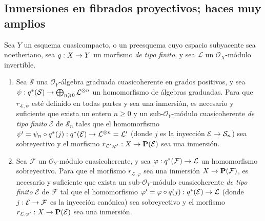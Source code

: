 \documentclass[oneside,10pt]{amsart}
\makeatletter
\renewcommand{\geq}{\geqslant}
\newcommand{\ega@arrow}[2]{\mathchoice{#1}{#2}{#2}{#2}}
\renewcommand{\to}{\ega@arrow{\longrightarrow}{\rightarrow}}
\newcommand{\oldpage}[2][]{\marginnote{\normalfont\footnotesize\textbf{#1}~|~#2}\ignorespaces}
\let\EGAOriginalLabel\label
\renewcommand{\label}[1]{\phantomsection\EGAOriginalLabel{#1}}
\makeatother
\begin{document}
\subsection{Inmersiones en fibrados proyectivos; haces muy amplios}
\label{subsection:II.4.4-fr}

\begin{proposition}[4.4.1]
\label{II.4.4.1-fr}
Sea $Y$ un esquema cuasicompacto, o un preesquema cuyo espacio subyacente sea noetheriano, sea $q:X\to Y$ un morfismo \emph{de tipo finito}, y sea $\mathcal{L}$ un $\mathcal{O}_X$-módulo invertible.
\begin{enumerate}
  \item[\rm{(i)}] Sea $\mathcal{S}$ una $\mathcal{O}_Y$-álgebra graduada cuasicoherente en grados positivos, y sea $\psi:q^*(\mathcal{S})\to\bigoplus_{n\geq0}\mathcal{L}^{\otimes n}$ un homomorfismo de álgebras graduadas.
    Para que $r_{\mathcal{L},\psi}$ esté definido en todas partes y sea una inmersión, es necesario y
\oldpage[II]{79}
    suficiente que exista un entero $n\geq0$ y un sub-$\mathcal{O}_Y$-módulo cuasicoherente \emph{de tipo finito} $\mathcal{E}$ de $\mathcal{S}_n$ tales que el homomorfismo $\psi'=\psi_n\circ q^*(j):q^*(\mathcal{E})
  \to\mathcal{L}^{\otimes n}=\mathcal{L}'$ (donde $j$ es la inyección $\mathcal{E}\to\mathcal{S}_n$) sea sobreyectivo y el morfismo $r_{\mathcal{L}',\varphi'}:X\to\mathbf{P}(\mathcal{E})$ sea una inmersión.
  \item[\rm{(ii)}] Sea $\mathcal{F}$ un $\mathcal{O}_Y$-módulo cuasicoherente, y sea $\varphi:q^*(\mathcal{F})\to\mathcal{L}$ un homomorfismo sobreyectivo.
    Para que el morfismo $r_{\mathcal{L},\varphi}$ sea una inmersión $X\to\mathbf{P}(\mathcal{F})$, es necesario y suficiente que exista un sub-$\mathcal{O}_Y$-módulo cuasicoherente \emph{de tipo finito} $\mathcal{E}$ de $\mathcal{F}$ tal que el homomorfismo $\varphi'=\varphi\circ q(j):q^*(\mathcal{E})\to\mathcal{L}$ (donde $j:\mathcal{E}\to\mathcal{F}$ es la inyección canónica) sea sobreyectivo y el morfismo $r_{\mathcal{L},\varphi'}:X\to\mathbf{P}(\mathcal{E})$ sea una inmersión.
\end{enumerate}
\end{proposition}
\end{document}

